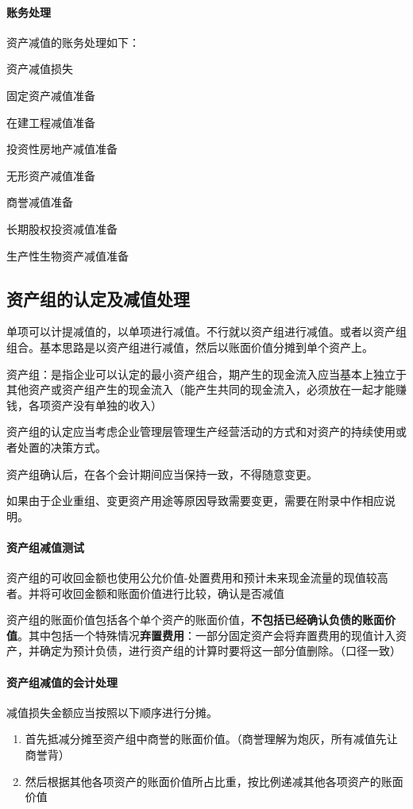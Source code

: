 \documentclass[UTF8,12pt]{ctexart}
\newenvironment{Dr}{%
	\begin{list}{}%
		{
			\setlength{\leftmargin}{2em}
			\setlength{\labelwidth}{2em}
			\setlength{\labelsep}{0pt}
			\setlength{\itemindent}{0pt}
			\setlength{\listparindent}{0pt}
			\setlength{\parsep}{0pt}
			\setlength{\topsep}{0pt}
		}
		\item[\textbf{借：}]
	}{%
	\end{list}
}
\newenvironment{Cr}{%
	\begin{list}{}%
		{
			\setlength{\leftmargin}{3em}
			\setlength{\labelwidth}{2em}
			\setlength{\labelsep}{0pt}
			\setlength{\itemindent}{0pt}
			\setlength{\listparindent}{0pt}
			\setlength{\parsep}{0pt}
			\setlength{\topsep}{0pt}
		}
		\item[\textbf{贷：}]
	}{%
	\end{list}
}
\numberwithin{equation}{section} %
\numberwithin{figure}{section}
\numberwithin{table}{section}
\begin{document}
	\paragraph{账务处理}
	资产减值的账务处理如下：
	
	\begin{Dr}
		资产减值损失
	\end{Dr}
	\begin{Cr}
		固定资产减值准备
		
		在建工程减值准备
		
		投资性房地产减值准备
		
		无形资产减值准备
		
		商誉减值准备
		
		长期股权投资减值准备
		
		生产性生物资产减值准备
	\end{Cr}
	
	
	\subsection{资产组的认定及减值处理}
	单项可以计提减值的，以单项进行减值。不行就以资产组进行减值。或者以资产组组合。基本思路是以资产组进行减值，然后以账面价值分摊到单个资产上。
	
	资产组：是指企业可以认定的最小资产组合，期产生的现金流入应当基本上独立于其他资产或资产组产生的现金流入（能产生共同的现金流入，必须放在一起才能赚钱，各项资产没有单独的收入）
	
	资产组的认定应当考虑企业管理层管理生产经营活动的方式和对资产的持续使用或者处置的决策方式。
	
	资产组确认后，在各个会计期间应当保持一致，不得随意变更。
	
	如果由于企业重组、变更资产用途等原因导致需要变更，需要在附录中作相应说明。
	
	\paragraph{资产组减值测试} 资产组的可收回金额也使用公允价值-处置费用和预计未来现金流量的现值较高者。并将可收回金额和账面价值进行比较，确认是否减值
	
	资产组的账面价值包括各个单个资产的账面价值，\textbf{不包括已经确认负债的账面价值}。其中包括一个特殊情况\textbf{弃置费用}：一部分固定资产会将弃置费用的现值计入资产，并确定为预计负债，进行资产组的计算时要将这一部分值删除。（口径一致）
	
	\paragraph{资产组减值的会计处理}
	减值损失金额应当按照以下顺序进行分摊。
	\begin{enumerate}
		\item 首先抵减分摊至资产组中商誉的账面价值。（商誉理解为炮灰，所有减值先让商誉背）
		
		\item 然后根据其他各项资产的账面价值所占比重，按比例递减其他各项资产的账面价值
	\end{enumerate}
	
\end{document}
